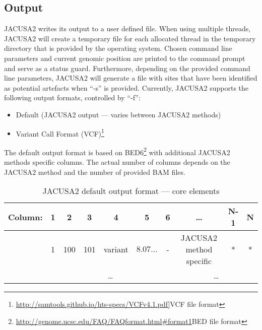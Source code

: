 \documentclass[10pt,a4paper,draft]{article}
\begin{document}
\subsection{Output}
JACUSA2 writes its output to a user defined file. When using multiple threads, JACUSA2 will
create a temporary file for each allocated thread in the temporary directory that is 
provided by the operating system. 
Chosen command line parameters and current genomic position are printed to the command prompt and serve as a status guard.
Furthermore, depending on the provided command line parameters, JACUSA2 will generate a file with sites that have been
identified as potential artefacts when ``-s'' is provided. Currently, JACUSA2 supports the following
output formats, controlled by ``-f'':
\begin{itemize}
  \item Default (JACUSA2 output --- varies between JACUSA2 methods)
  \item Variant Call Format (VCF)\footnote{\url{http://samtools.github.io/hts-specs/VCFv4.1.pdf]}{VCF file format}}
\end{itemize}
The default output format is based on
BED6\footnote{\url{http://genome.ucsc.edu/FAQ/FAQformat.html\#format1}{BED file format}} with
additional JACUSA2 methods specific columns. The actual number of columns depends on the JACUSA2 method and 
the number of provided BAM files.
\begin{table}[ht]
\caption{JACUSA2 default output format --- core elements}
{\small
\begin{tabular}{lcccccc|ccc}
Column: & 1 & 2 & 3 & 4 & 5 & 6 & \ldots & N-1 & N \\
\hline
& 1 & 100 & 101 & variant & $8.07\ldots$ & - & JACUSA2 method specific & * & * \\	
& \multicolumn{6}{c|}{\ldots} & \multicolumn{4}{c}{\ldots}
\end{tabular}}
\end{table}
\end{document}
